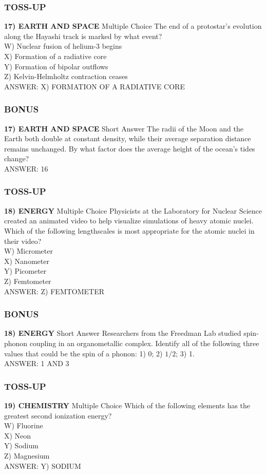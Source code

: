 \subsubsection*{TOSS-UP}
\textbf{17) EARTH AND SPACE}
Multiple Choice The end of a protostar's evolution along the Hayashi track is marked by what event?
\\W) Nuclear fusion of helium-3 begins
\\X) Formation of a radiative core
\\Y) Formation of bipolar outflows
\\Z) Kelvin-Helmholtz contraction ceases
\\ANSWER: X) FORMATION OF A RADIATIVE CORE

\subsubsection*{BONUS}
\textbf{17) EARTH AND SPACE}
Short Answer The radii of the Moon and the Earth both double at constant density, while their average separation distance remains unchanged. By what factor does the average height of the ocean's tides change?
\\ANSWER: 16

\newpage

\subsubsection*{TOSS-UP}
\textbf{18) ENERGY}
Multiple Choice Physicists at the Laboratory for Nuclear Science created an animated video to help visualize simulations of heavy atomic nuclei. Which of the following lengthscales is most appropriate for the atomic nuclei in their video?
\\W) Micrometer
\\X) Nanometer
\\Y) Picometer
\\Z) Femtometer
\\ANSWER: Z) FEMTOMETER

\subsubsection*{BONUS}
\textbf{18) ENERGY}
Short Answer Researchers from the Freedman Lab studied spin-phonon coupling in an organometallic complex. Identify all of the following three values that could be the spin of a phonon: 1) 0; 2) $1/2$; 3) 1.
\\ANSWER: 1 AND 3

\subsubsection*{TOSS-UP}
\textbf{19) CHEMISTRY}
Multiple Choice Which of the following elements has the greatest second ionization energy?
\\W) Fluorine
\\X) Neon
\\Y) Sodium
\\Z) Magnesium
\\ANSWER: Y) SODIUM

